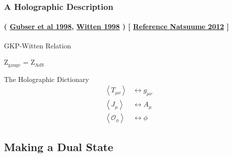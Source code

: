 \documentclass[xcolor=dvipsnames]{beamer}
\begin{document}
\begin{frame}
  \frametitle{A Holographic Description }
  \framesubtitle{
    (
    \href{https://inspirehep.net/literature/467202}{Gubser et al 1998},
    \href{https://inspirehep.net/literature/467400}{Witten 1998}
  ) [ \href{https://inspirehep.net/literature/1316320}{Reference Natsuume 2012} ]}
  \begin{block}{GKP-Witten Relation}
    \begin{center}Z$_\text{gauge}$ = Z$_\text{AdS}$\end{center}
  \end{block}

  \begin{block}{The Holographic Dictionary}
    \begin{align*}
      \left\langle T_{\mu\nu}\right\rangle &\longleftrightarrow g_{\mu\nu}\\
      \left\langle J_{\mu}\right\rangle &\longleftrightarrow A_{\mu}\\
      \left\langle\mathcal O_\phi\right\rangle &\longleftrightarrow \phi
    \end{align*}
  \end{block}


\end{frame}

\subsection{Making a Dual State}
\end{document}
